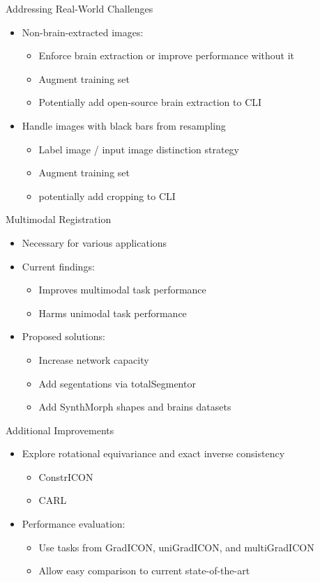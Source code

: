 \documentclass{beamer}
\begin{document}
\begin{frame}{Addressing Real-World Challenges}
	\begin{itemize}
		\item Non-brain-extracted images:
		\begin{itemize}
			\item Enforce brain extraction or improve performance without it
			\item Augment training set
			\item Potentially add open-source brain extraction to CLI
		\end{itemize}
		\item Handle images with black bars from resampling
		\begin{itemize}
		\item Label image / input image distinction strategy
			\item Augment training set
			\item potentially add cropping to CLI
		\end{itemize}
	\end{itemize}
\end{frame}

\begin{frame}{Multimodal Registration}
	\begin{itemize}
		\item Necessary for various applications
		\item Current findings:
		\begin{itemize}
			\item Improves multimodal task performance
			\item Harms unimodal task performance
		\end{itemize}
		\item Proposed solutions:
		\begin{itemize}
			\item Increase network capacity
			\item Add segentations via totalSegmentor
			\item Add SynthMorph shapes and brains datasets
		\end{itemize}
	\end{itemize}
\end{frame}

\begin{frame}{Additional Improvements}
	\begin{itemize}
		\item Explore rotational equivariance and exact inverse consistency
		\begin{itemize}
			\item ConstrICON
			\item CARL
		\end{itemize}
		\item Performance evaluation:
		\begin{itemize}
			\item Use tasks from GradICON, uniGradICON, and multiGradICON
			\item Allow easy comparison to current state-of-the-art
		\end{itemize}
	\end{itemize}
\end{frame}
\end{document}
